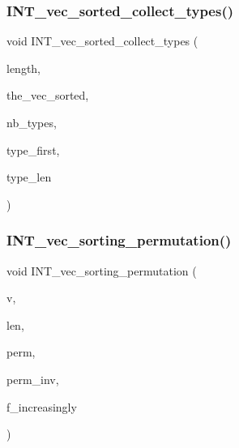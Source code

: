 \subsubsection{\texorpdfstring{I\+N\+T\+\_\+vec\+\_\+sorted\+\_\+collect\+\_\+types()}{INT\_vec\_sorted\_collect\_types()}}
{\footnotesize\ttfamily void I\+N\+T\+\_\+vec\+\_\+sorted\+\_\+collect\+\_\+types (\begin{DoxyParamCaption}\item[{\mbox{\hyperlink{galois_8h_a09fddde158a3a20bd2dcadb609de11dc}{I\+NT}}}]{length,  }\item[{\mbox{\hyperlink{galois_8h_a09fddde158a3a20bd2dcadb609de11dc}{I\+NT}} $\ast$}]{the\+\_\+vec\+\_\+sorted,  }\item[{\mbox{\hyperlink{galois_8h_a09fddde158a3a20bd2dcadb609de11dc}{I\+NT}} \&}]{nb\+\_\+types,  }\item[{\mbox{\hyperlink{galois_8h_a09fddde158a3a20bd2dcadb609de11dc}{I\+NT}} $\ast$}]{type\+\_\+first,  }\item[{\mbox{\hyperlink{galois_8h_a09fddde158a3a20bd2dcadb609de11dc}{I\+NT}} $\ast$}]{type\+\_\+len }\end{DoxyParamCaption})}

\mbox{\label{sorting_8_c_a10768733e01e8c9ded3c886e6ddb671e}} 
\subsubsection{\texorpdfstring{I\+N\+T\+\_\+vec\+\_\+sorting\+\_\+permutation()}{INT\_vec\_sorting\_permutation()}}
{\footnotesize\ttfamily void I\+N\+T\+\_\+vec\+\_\+sorting\+\_\+permutation (\begin{DoxyParamCaption}\item[{\mbox{\hyperlink{galois_8h_a09fddde158a3a20bd2dcadb609de11dc}{I\+NT}} $\ast$}]{v,  }\item[{\mbox{\hyperlink{galois_8h_a09fddde158a3a20bd2dcadb609de11dc}{I\+NT}}}]{len,  }\item[{\mbox{\hyperlink{galois_8h_a09fddde158a3a20bd2dcadb609de11dc}{I\+NT}} $\ast$}]{perm,  }\item[{\mbox{\hyperlink{galois_8h_a09fddde158a3a20bd2dcadb609de11dc}{I\+NT}} $\ast$}]{perm\+\_\+inv,  }\item[{\mbox{\hyperlink{galois_8h_a09fddde158a3a20bd2dcadb609de11dc}{I\+NT}}}]{f\+\_\+increasingly }\end{DoxyParamCaption})}

